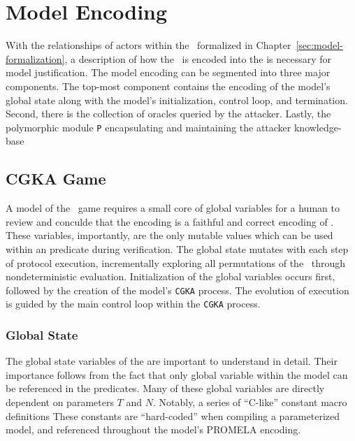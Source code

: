 \hypertarget{sec:model-encoding}{%
\chapter{Model Encoding}\label{sec:model-encoding}}

With the relationships of actors within the \CGKAsec\ formalized in Chapter\ \ref{sec:model-formalization}, a description of how the \CGKAsec\ is encoded into the  is necessary for model justification.
The  model encoding can be segmented into three major components.
The top-most component contains the encoding of the model's global state along with the model's initialization, control loop, and termination.
Second, there is the collection of oracles queried by the attacker.
Lastly, the polymorphic module \texttt{P} encapsulating and maintaining the attacker knowledge-base


\hypertarget{sec:CGKA-game-encoding}{%
\section{CGKA Game}\label{sec:CGKA-game-encoding}}

A model of the \CGKAsec\ game requires a small core of global variables for a human to review and conculde that the encoding is a faithful and correct encoding of \CGKAsec.
These variables, importantly, are the only mutable values which can be used within an  predicate during verification.
The global state mutates with each step of protocol execution, incrementally exploring all permutations of the \CGKAsec\ through nondeterministic evaluation.
Initialization of the global variables occurs first, followed by the creation of the model's \texttt{CGKA} process.
The evolution of execution is guided by the main control loop within the \texttt{CGKA} process.


\hypertarget{subsec:global-state}{%
\subsection{Global State}\label{subsec:global-state}}

The global state variables of the  are important to understand in detail.
Their importance follows from the fact that only global variable within the  model can be referenced in the  predicates.
Many of these global variables are directly dependent on parameters \(T\) and \(N\).
Notably, a series of ``C-like'' constant macro definitions
These constants are ``hard-coded'' when compiling a parameterized model, and referenced throughout the model's PROMELA encoding.

